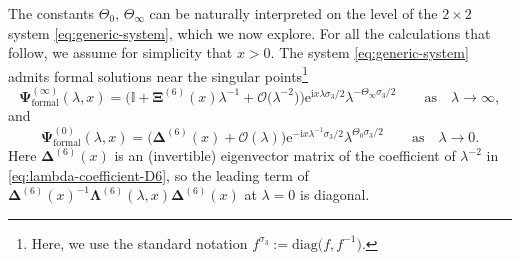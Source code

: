 \documentclass[11pt]{article}
\numberwithin{equation}{section}
\numberwithin{equation}{section}
\newcommand{\ee}{\mathrm{e}}
\newcommand{\ii}{\mathrm{i}}
\begin{document}
The constants $\Theta_0$, $\Theta_\infty$ can be naturally interpreted on the level of the $2 \times 2$ system \eqref{eq:generic-system}, which we now explore. For all the calculations that follow, we assume for simplicity that $x > 0$. The system \eqref{eq:generic-system} admits formal solutions near the singular points\footnote{Here, we use the standard notation $f^{\sigma_3} := \mathrm{diag}\big(f, f^{-1}\big)$.}
\begin{equation}
\mathbf{\Psi}_{\text{formal}}^{(\infty)}(\lambda, x) = \big( \mathbb{I} +\mathbf{\Xi}^{(6)}(x)\lambda^{-1}+ \mathcal{O}\big(\lambda^{-2}\big) \big) \ee^{\ii x \lambda \sigma_3 /2} \lambda^{-\Theta_\infty \sigma_3/2} \qquad \text{as} \quad \lambda \to \infty,
\label{eq:formal-infty}
\end{equation}
and
\begin{equation}
\mathbf{\Psi}^{(0)}_{\text{formal}}(\lambda, x) = \big( \mathbf{\Delta}^{(6)}(x) + \mathcal{O}(\lambda) \big) \ee^{-\ii x \lambda^{-1} \sigma_3 /2} \lambda^{\Theta_0 \sigma_3/2} \qquad \text{as} \quad \lambda \to 0.
\label{eq:formal-zero}
\end{equation}
Here $\mathbf{\Delta}^{(6)}(x)$ is an (invertible) eigenvector matrix of the coefficient of $\lambda^{-2}$ in \eqref{eq:lambda-coefficient-D6}, so the leading term of $\mathbf{\Delta}^{(6)}(x)^{-1}\mathbf{\Lambda}^{(6)}(\lambda,x)\mathbf{\Delta}^{(6)}(x)$ at $\lambda=0$ is diagonal.
\end{document}
